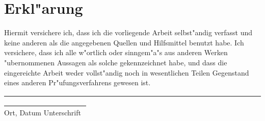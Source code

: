 
\section*{Erkl"arung}
{\large\textsf{Hiermit versichere ich, dass ich die vorliegende Arbeit 
   selbst"andig verfasst und keine anderen als die angegebenen Quellen und 
   Hilfsmittel benutzt habe. Ich versichere, dass ich alle w"ortlich oder 
   sinngem"a"s aus anderen Werken "ubernommenen Aussagen als solche gekennzeichnet
   habe, und dass die eingereichte Arbeit weder vollst"andig noch in wesentlichen
   Teilen Gegenstand eines anderen Pr"ufungsverfahrens gewesen ist.
   \vspace*{3em}\\
   \underline{\ \ \ \ \ \ \ \ \ \ \ \ \ \ \ \ \ \ \ \ \ \ \ \ \ \ \ \ \ \ \ \ \ 
              \ \ \ \ \ \ \ \ \ \ \ \ \ \ \ \ \ \ \ \ \ \ \ \ \ \ \ \ \ \ \ \ \ 
              \ \ \ \ \ \ \ \ \ \ \ \ \ \ \ \ \ \ \ \ \ \ \ \ \ \ \ \ \ }\\[1.0ex]
   Ort, Datum \hspace{5cm} Unterschrift}}
